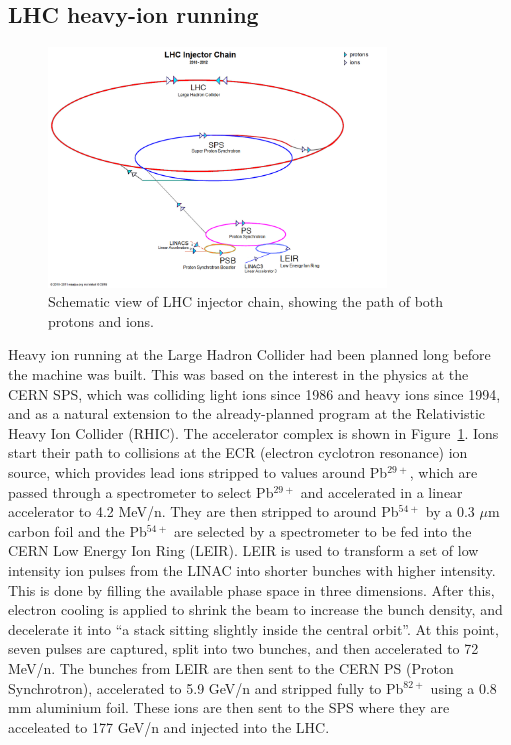 \subsection{LHC heavy-ion running}
\label{subsecall:running}

\begin{figure}[!htb]
\begin{center}
\includegraphics[width=0.8\textwidth]{introduction_figs/LHC_chain.png}
\caption[]{Schematic view of LHC injector chain, showing the path of both protons and ions.}
\label{fig:pas:intro:lhc}
\end{center}
\end{figure}

Heavy ion running at the Large Hadron Collider had been planned long before the machine was built.
This was based on the interest in the physics at the CERN SPS, which was colliding light ions since
1986 and heavy ions since 1994, and as a natural extension to the already-planned program
at the Relativistic Heavy Ion Collider (RHIC).
The accelerator complex is shown in Figure~\ref{fig:pas:intro:lhc}.
Ions start their path to collisions at the ECR (electron cyclotron resonance) ion source,
which provides lead ions stripped to values around Pb$^{29+}$, which are passed through
a spectrometer to select Pb$^{29+}$ and accelerated in a linear accelerator to 4.2 MeV/n.
They are then stripped to around Pb$^{54+}$ by a 0.3 $\mu$m carbon foil and the
Pb$^{54+}$ are selected by a spectrometer to be fed into the CERN Low Energy Ion Ring (LEIR).
LEIR is used to transform a set of low intensity ion pulses from the LINAC into shorter
bunches with higher intensity.  This is done by filling the available phase space in
three dimensions.  After this, electron cooling is applied to shrink the beam to increase the
bunch density, and decelerate it into ``a stack sitting slightly inside the central orbit''.
At this point, seven pulses are captured, split into two bunches, and then accelerated to
72 MeV/n.
The bunches from LEIR are then sent to the CERN PS (Proton Synchrotron), accelerated to
5.9 GeV/n and stripped fully to Pb$^{82+}$ using a 0.8 mm aluminium foil.  These ions
are then sent to the SPS where they are acceleated to 177 GeV/n and injected into the LHC.

